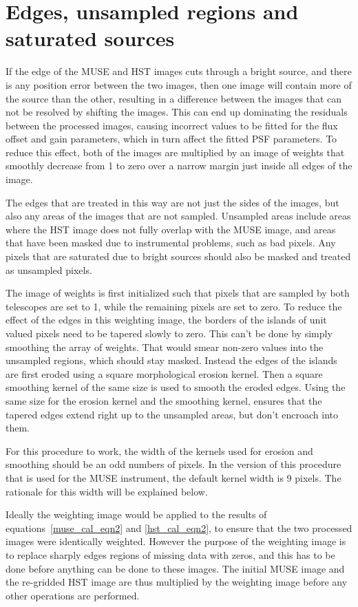 \documentclass[12pt,twoside,a4paper]{article}
\begin{document}
\section{Edges, unsampled regions and saturated sources}

If the edge of the MUSE and HST images cuts through a bright source,
and there is any position error between the two images, then one image
will contain more of the source than the other, resulting in a
difference between the images that can not be resolved by shifting the
images. This can end up dominating the residuals between the processed
images, causing incorrect values to be fitted for the flux offset and
gain parameters, which in turn affect the fitted PSF parameters.  To
reduce this effect, both of the images are multiplied by an image of
weights that smoothly decrease from 1 to zero over a narrow margin
just inside all edges of the image.

The edges that are treated in this way are not just the sides of the
images, but also any areas of the images that are not
sampled. Unsampled areas include areas where the HST image does not
fully overlap with the MUSE image, and areas that have been masked due
to instrumental problems, such as bad pixels. Any pixels that are
saturated due to bright sources should also be masked and treated as
unsampled pixels.

The image of weights is first initialized such that pixels that are
sampled by both telescopes are set to 1, while the remaining pixels
are set to zero. To reduce the effect of the edges in this weighting
image, the borders of the islands of unit valued pixels need to be
tapered slowly to zero. This can't be done by simply smoothing the
array of weights. That would smear non-zero values into the unsampled
regions, which should stay masked. Instead the edges of the islands
are first eroded using a square morphological erosion kernel. Then a
square smoothing kernel of the same size is used to smooth the eroded
edges. Using the same size for the erosion kernel and the smoothing
kernel, ensures that the tapered edges extend right up to the
unsampled areas, but don't encroach into them.

For this procedure to work, the width of the kernels used for erosion
and smoothing should be an odd numbers of pixels. In the version of
this procedure that is used for the MUSE instrument, the default
kernel width is 9 pixels. The rationale for this width will be
explained below.

Ideally the weighting image would be applied to the results of
equations~\ref{muse_cal_eqn2} and \ref{hst_cal_eqn2}, to ensure that
the two processed images were identically weighted. However the
purpose of the weighting image is to replace sharply edges regions of
missing data with zeros, and this has to be done before anything can
be done to these images. The initial MUSE image and the re-gridded HST
image are thus multiplied by the weighting image before any other
operations are performed.
\end{document}
